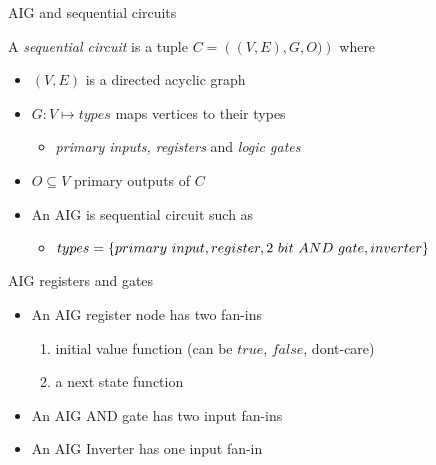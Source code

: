 \begin{frame}{AIG and sequential circuits}
\begin{definition}
  A {\em sequential circuit } is a tuple $C = \left((V,E),G,O)\right)$ where
\begin{itemize}
 \item $(V,E)$ is a directed acyclic graph 
 \item $G: V \mapsto types$ maps vertices to their types 
 \begin{itemize} \item {\em primary inputs, registers} and {\em logic gates}\end{itemize}
 \item $O \subseteq V$ primary outputs of $C$
 \item An AIG is sequential circuit such as
 \begin{itemize}
  \item $types = \left\{ primary~input, register, 2~bit~AND~gate, inverter \right\}$
 \end{itemize}
\end{itemize}
\end{definition}
\end{frame}

\begin{frame}{AIG registers and gates}
\begin{itemize}
 \item An AIG register node has two fan-ins
 \begin{enumerate}
  \item initial value function (can be $true$, $false$, dont-care)
  \item a next state function
 \end{enumerate}
 \item An AIG AND gate has two input fan-ins
 \item An AIG Inverter has one input fan-in
\end{itemize}
\end{frame}


